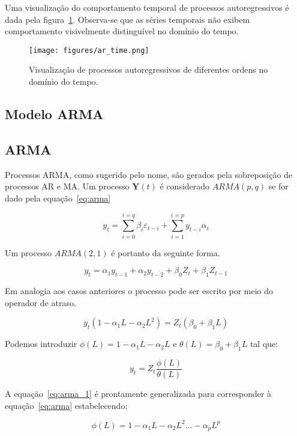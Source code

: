 Uma visualização do comportamento temporal de processos autoregressivos é dada
pela figura~\ref{fig:ar_time_visualization}. Observa-se que as séries temporais
não exibem comportamento visivelmente distinguível no domínio do tempo.

\begin{figure}[H]
    \centering
    \texttt{[image: figures/ar\_time.png]}
    \caption{Visualização de processos autoregressivos de diferentes ordens
    no domínio do tempo.}
    \label{fig:ar_time_visualization}
\end{figure}

\subsection{Modelo ARMA}
\label{ssec:ARMA}

\subsection{ARMA}\label{ssec:ARMA}

Processos ARMA, como sugerido pelo nome, são gerados pela sobreposição de
processos AR e MA. Um processo $\mathbf{Y}(t)$ é considerado $ARMA(p, q)$ se
for dado pela equação~\ref{eq:arma}

\begin{equation}\label{eq:arma}
    y_t = \sum_{i=0}^{i=q} \beta_i \varepsilon_{t-i} + \sum_{i=1}^{i=p} y_{t-i}\alpha_i
\end{equation}

Um processo $ARMA(2, 1)$ é portanto da seguinte forma.

$$ y_t = \alpha_1 y_{t-1} + \alpha_2 y_{t-2} + \beta_0 Z_{t} + \beta_1 Z_{t-1}  $$

Em analogia aos casos anteriores o processo pode ser escrito por meio do
operador de atraso.

$$ y_t (1 - \alpha_1 L - \alpha_2 L^2) = Z_{t} (\beta_0 + \beta_1 L) $$

Podemos introduzir $\phi(L) = 1 - \alpha_1 L - \alpha_2 L$ e $\theta(L) =
\beta_0 + \beta_1 L$ tal que:

\begin{equation}\label{eq:arma_l}
    y_t = Z_t \frac{\phi(L)}{\theta(L)}
\end{equation}

A equação~\ref{eq:arma_1} é prontamente generalizada para corresponder à
equação~\ref{eq:arma} estabelecendo:

$$\phi(L) = 1 - \alpha_1 L - \alpha_2 L^2 \hdots - \alpha_p L^p$$

